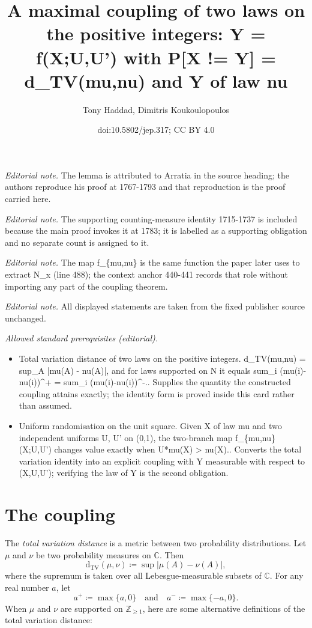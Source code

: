 \documentclass[10pt,a4paper]{article}
\title{A maximal coupling of two laws on the positive integers: Y = f(X;U,U') with P[X != Y] = d\_TV(mu,nu) and Y of law nu}
\author{Tony Haddad, Dimitris Koukoulopoulos}
\date{doi:10.5802/jep.317; CC BY 4.0}
\newcommand{\ZZ}{\mathbb{Z}}
\newcommand{\CC}{\mathbb{C}}
\newcommand{\dtv}{\mathrm{d}_{\mathrm{TV}}}
\theoremstyle{plain}
\theoremstyle{definition}
\begin{document}
\maketitle
\noindent\textit{Editorial note.} The lemma is attributed to Arratia in the source heading; the authors reproduce his proof at 1767-1793 and that reproduction is the proof carried here.\par\medskip
\noindent\textit{Editorial note.} The supporting counting-measure identity 1715-1737 is included because the main proof invokes it at 1783; it is labelled as a supporting obligation and no separate count is assigned to it.\par\medskip
\noindent\textit{Editorial note.} The map f\_\{mu,nu\} is the same function the paper later uses to extract N\_x (line 488); the context anchor 440-441 records that role without importing any part of the coupling theorem.\par\medskip
\noindent\textit{Editorial note.} All displayed statements are taken from the fixed publisher source unchanged.\par\medskip
\noindent\textit{Allowed standard prerequisites (editorial).}\begin{itemize}
\item Total variation distance of two laws on the positive integers. d\_TV(mu,nu) = sup\_A |mu(A) - nu(A)|, and for laws supported on N it equals sum\_i (mu(i)-nu(i))\textasciicircum{}+ = sum\_i (mu(i)-nu(i))\textasciicircum{}-.. Supplies the quantity the constructed coupling attains exactly; the identity form is proved inside this card rather than assumed.
\item Uniform randomisation on the unit square. Given X of law mu and two independent uniforms U, U' on (0,1), the two-branch map f\_\{mu,nu\}(X;U,U') changes value exactly when U*mu(X) > nu(X).. Converts the total variation identity into an explicit coupling with Y measurable with respect to (X,U,U'); verifying the law of Y is the second obligation.
\end{itemize}\medskip
\section{The coupling}
\label{sec:coupling}

The \textit{total variation distance} is a metric between two probability distributions. Let $\mu$ and $\nu$ be two probability measures on $\CC$. Then
\begin{equation}
\label{eq:dtv dfn}
\dtv(\mu, \nu) \coloneqq \sup |\mu(A) - \nu(A)|,
\end{equation}
where the supremum is taken over all Lebesgue-measurable subsets of $\CC$. For any real number $a$, let
\[
a^+ \coloneqq \max\{a, 0\} \quad \text{and} \quad a^- \coloneqq \max\{-a, 0\}.
\]When $\mu$ and $\nu$ are supported on $\ZZ_{\ge 1}$, here are some alternative definitions of the total variation distance:
\end{document}
